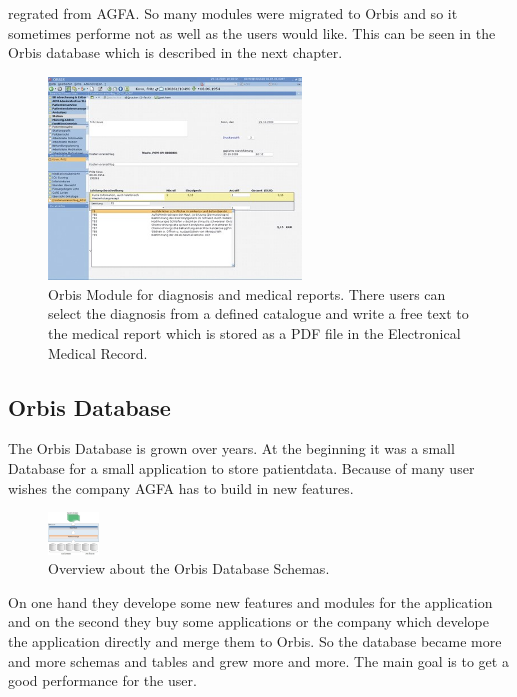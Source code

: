 \documentclass[a4paper]{article}
\begin{document}
	regrated from AGFA. So many modules were migrated to Orbis and so it sometimes
	performe not as well as the users would like. This can be seen in the Orbis
	database which is described in the next chapter.\\
	\begin{figure}[!ht]
		  \centering
		      \includegraphics[width=0.6\textwidth]{orbis2}
		  \caption{Orbis Module for diagnosis and medical reports. There users can
		  select the diagnosis from a defined catalogue and write a free text to the
		  medical report which is stored as a PDF file in the Electronical Medical
		  Record.}
	\end{figure}
	\subsection{Orbis Database}
	The Orbis Database is grown over years. At the beginning it was a small
	Database for a small application to store patientdata. Because of many user
	wishes the company AGFA has to build in new features. \\
	\begin{figure}[!ht]
		  \centering
		      \includegraphics[width=0.12\textwidth]{orbis_db_schema}
		  \caption{Overview about the Orbis Database Schemas.}
	\end{figure}
	On one hand they develope some new features and modules for the application and
	on the second they buy some applications or the company which develope the application directly and
	merge them to Orbis. So the database became more and more schemas and tables
	and grew more and more. The main goal is to get a good performance for the
	user.
\end{document}
